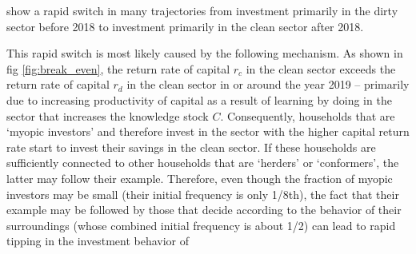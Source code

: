 show a rapid switch in many trajectories from investment primarily in the dirty sector before 2018 to investment primarily in the clean sector after 2018. 

This rapid switch is most likely caused by the following mechanism. As shown in fig \ref{fig:break_even}, the return rate of capital $r_c$ in the clean sector exceeds the return rate of capital $r_d$ in the clean sector in or around the year 2019 -- primarily due to increasing productivity of capital as a result of learning by doing in the sector that increases the knowledge stock $C$. Consequently, households that are `myopic investors' and therefore invest in the sector with the higher capital return rate start to invest their savings in the clean sector. If these households are sufficiently connected to other households that are `herders' or `conformers', the latter may follow their example. Therefore, even though the fraction of myopic investors may be small (their initial frequency is only 1/8th), the fact that their example may be followed by those that decide according to the behavior of their surroundings (whose combined initial frequency is about 1/2) can lead to rapid tipping in the investment behavior of 


